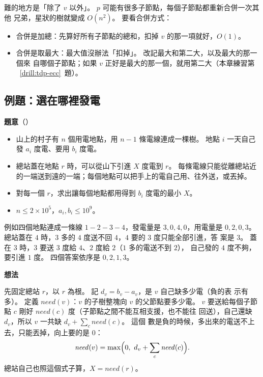 難的地方是「除了 $v$ 以外」。 $p$ 可能有很多子節點，每個子節點都重新合併一次其他
兄弟，星狀的樹就變成 $O(n^2)$。 要看合併方式：

\begin{itemize}
\item 合併是加總：先算好所有子節點的總和，扣掉 $v$ 的那一項就好，$O(1)$。
\item 合併是取最大：最大值沒辦法「扣掉」。 改記最大和第二大，以及最大的那一個來
自哪個子節點；如果 $v$ 正好是最大的那一個，就用第二大（本章練習第
~\ref{drill:tdp-ecc}~題）。
\end{itemize}

\subsection{例題：選在哪裡發電}
\label{sec:tdp-ex-power}

\textbf{題意}（）

\begin{itemize}
\item 山上的村子有 $n$ 個用電地點，用 $n - 1$ 條電線連成一棵樹。 地點 $i$ 一天自己
發 $a_i$ 度電、要用 $b_i$ 度電。
\item 總站蓋在地點 $r$ 時，可以從山下引進 $X$ 度電到 $r$。 每條電線只能從離總站近
的一端送到遠的一端；每個地點可以把手上的電自己用、往外送，或丟掉。
\item 對每一個 $r$，求出讓每個地點都用得到 $b_i$ 度電的最小 $X$。
\item $n \le 2 \times 10^5$，$a_i, b_i \le 10^9$。
\end{itemize}

例如四個地點連成一條線 $1 - 2 - 3 - 4$，發電量是 $3, 0, 4, 0$，用電量是 $0, 2, 0,
3$。 總站蓋在 $4$ 時，$3$ 多的 $4$ 度送不回 $4$，$4$ 要的 $3$ 度只能全部引進，答
案是 $3$。 蓋在 $3$ 時，$3$ 要送 $3$ 度給 $4$、$2$ 度給 $2$（$1$ 多的電送不到 $2$），
自己發的 $4$ 度不夠，要引進 $1$ 度。 四個答案依序是 $0, 2, 1, 3$。

\textbf{想法}

先固定總站 $r$，以 $r$ 為根。 記 $d_v = b_v - a_v$，是 $v$ 自己缺多少電（負的表
示有多）。 定義 $\mathit{need}(v)$：$v$ 的子樹整塊向 $v$ 的父節點要多少電。 $v$
要送給每個子節點 $c$ 剛好 $\mathit{need}(c)$ 度（子節點之間不能互相支援，也不能往
回送），自己還缺 $d_v$，所以 $v$ 一共缺 $d_v + \sum_c \mathit{need}(c)$。 這個
數是負的時候，多出來的電送不上去，只能丟掉，向上要的是 $0$：
\[
\mathit{need}(v) = \max\Bigl(0,\ d_v + \sum_c \mathit{need}(c)\Bigr).
\]
總站自己也照這個式子算，$X = \mathit{need}(r)$。

